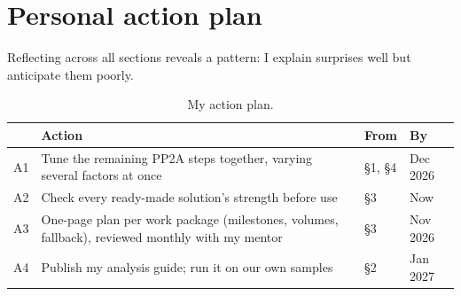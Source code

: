 \documentclass[a4paper,11pt]{article}
\begin{document}
\section*{Personal action plan}
Reflecting across all sections \parencite{moon2006} reveals a pattern: I explain surprises well but anticipate them poorly.

\begin{table}[H]
\centering\small
\caption{My action plan.}\label{tab:plan}
\begin{tabularx}{\textwidth}{@{}lLll@{}}
\toprule
& Action & From & By \\
\midrule
A1 & Tune the remaining PP2A steps together, varying several factors at once & \S1, \S4 & Dec 2026 \\
A2 & Check every ready-made solution's strength before use & \S3 & Now \\
A3 & One-page plan per work package (milestones, volumes, fallback), reviewed monthly with my mentor & \S3 & Nov 2026 \\
A4 & Publish my analysis guide; run it on our own samples & \S2 & Jan 2027 \\
\bottomrule
\end{tabularx}
\end{table}

\printbibliography
\end{document}
